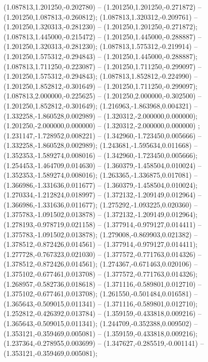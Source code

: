  (1.087813,1.201250,-0.202780) -- (1.201250,1.201250,-0.271872) -- (1.201250,1.087813,-0.260812);
 (1.087813,1.320312,-0.209761) -- (1.201250,1.320313,-0.281230) -- (1.201250,1.201250,-0.271872);
 (1.087813,1.445000,-0.215472) -- (1.201250,1.445000,-0.288887) -- (1.201250,1.320313,-0.281230);
 (1.087813,1.575312,-0.219914) -- (1.201250,1.575312,-0.294843) -- (1.201250,1.445000,-0.288887);
 (1.087813,1.711250,-0.223087) -- (1.201250,1.711250,-0.299097) -- (1.201250,1.575312,-0.294843);
 (1.087813,1.852812,-0.224990) -- (1.201250,1.852812,-0.301649) -- (1.201250,1.711250,-0.299097);
 (1.087813,2.000000,-0.225625) -- (1.201250,2.000000,-0.302500) -- (1.201250,1.852812,-0.301649);
 (1.216963,-1.863968,0.004321) -- (1.332258,-1.860528,0.002989) -- (1.320312,-2.000000,0.000000);
 (1.201250,-2.000000,0.000000) -- (1.320312,-2.000000,0.000000) ;
 (1.231147,-1.728952,0.008221) -- (1.342960,-1.723450,0.005666) -- (1.332258,-1.860528,0.002989);
 (1.243681,-1.595634,0.011668) -- (1.352353,-1.589274,0.008016) -- (1.342960,-1.723450,0.005666);
 (1.254453,-1.464709,0.014630) -- (1.360379,-1.458504,0.010024) -- (1.352353,-1.589274,0.008016);
 (1.263365,-1.336875,0.017081) -- (1.366986,-1.331636,0.011677) -- (1.360379,-1.458504,0.010024);
 (1.270334,-1.212824,0.018997) -- (1.372132,-1.209149,0.012964) -- (1.366986,-1.331636,0.011677);
 (1.275292,-1.093225,0.020360) -- (1.375783,-1.091502,0.013878) -- (1.372132,-1.209149,0.012964);
 (1.278193,-0.978719,0.021158) -- (1.377914,-0.979127,0.014411) -- (1.375783,-1.091502,0.013878);
 (1.279008,-0.869903,0.021382) -- (1.378512,-0.872426,0.014561) -- (1.377914,-0.979127,0.014411);
 (1.277728,-0.767323,0.021030) -- (1.377572,-0.771763,0.014326) -- (1.378512,-0.872426,0.014561);
 (1.274367,-0.671463,0.020106) -- (1.375102,-0.677461,0.013708) -- (1.377572,-0.771763,0.014326);
 (1.268957,-0.582736,0.018618) -- (1.371116,-0.589801,0.012710) -- (1.375102,-0.677461,0.013708);
 (1.261550,-0.501484,0.016581) -- (1.365643,-0.509015,0.011341) -- (1.371116,-0.589801,0.012710);
 (1.252812,-0.426392,0.013784) -- (1.359159,-0.433818,0.009216) -- (1.365643,-0.509015,0.011341);
 (1.244709,-0.352388,0.009502) -- (1.353121,-0.359469,0.005081) -- (1.359159,-0.433818,0.009216);
 (1.237364,-0.278955,0.003699) -- (1.347627,-0.285519,-0.001141) -- (1.353121,-0.359469,0.005081);
